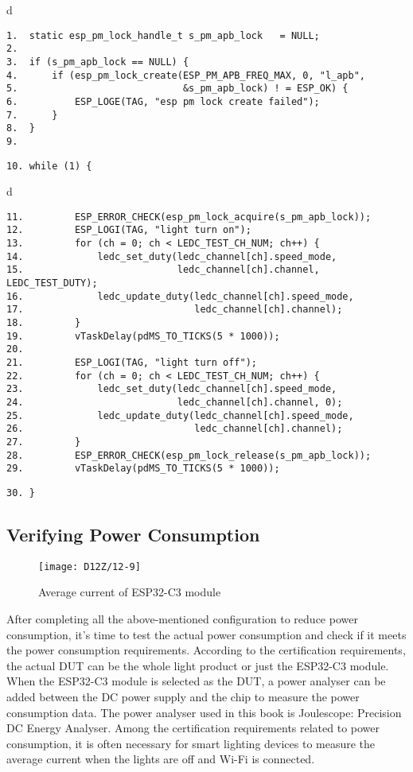 \documentclass[a4paper,12pt]{book}
\begin{document}
\begin{codebloc}
\begin{tabular}{d}
\vspace{2pt}
\begin{verbatim}
1.	static esp_pm_lock_handle_t s_pm_apb_lock   = NULL;
2.	
3.	if (s_pm_apb_lock == NULL) {
4. 	    if (esp_pm_lock_create(ESP_PM_APB_FREQ_MAX, 0, "l_apb",
5.                             &s_pm_apb_lock) ! = ESP_OK) {
6. 	        ESP_LOGE(TAG, "esp pm lock create failed");
7. 	    }
8.	}
9.	
\end{verbatim}
\verb|10. while (1) {|
\end{tabular}
\end{codebloc}

\begin{codebloc}
\begin{tabular}{d}
\vspace{2pt}
\begin{verbatim}
11.         ESP_ERROR_CHECK(esp_pm_lock_acquire(s_pm_apb_lock));
12.         ESP_LOGI(TAG, "light turn on");
13.         for (ch = 0; ch < LEDC_TEST_CH_NUM; ch++) {
14.             ledc_set_duty(ledc_channel[ch].speed_mode,
15.                           ledc_channel[ch].channel, LEDC_TEST_DUTY);
16.             ledc_update_duty(ledc_channel[ch].speed_mode,
17.                              ledc_channel[ch].channel);
18.         }
19.         vTaskDelay(pdMS_TO_TICKS(5 * 1000));
20.
21.         ESP_LOGI(TAG, "light turn off");
22.         for (ch = 0; ch < LEDC_TEST_CH_NUM; ch++) {
23.             ledc_set_duty(ledc_channel[ch].speed_mode,
24.                           ledc_channel[ch].channel, 0);
25.             ledc_update_duty(ledc_channel[ch].speed_mode,
26.                              ledc_channel[ch].channel);
27.         }
28.         ESP_ERROR_CHECK(esp_pm_lock_release(s_pm_apb_lock));
29.         vTaskDelay(pdMS_TO_TICKS(5 * 1000));
\end{verbatim}
\verb|30. }|
\end{tabular}
\end{codebloc}

\subsection{Verifying Power Consumption}
\begin{figure}[!h]
    \centering
    \texttt{[image: D12Z/12-9]}
    \caption{Average current of ESP32-C3 module}
\end{figure}
After completing all the above-mentioned configuration to reduce power consumption, it’s time to test the actual power consumption and check if it meets the power consumption requirements. According to the certification requirements, the actual DUT can be the whole light product or just the ESP32-C3 module. When the ESP32-C3 module is selected as the DUT, a power analyser can be added between the DC power supply and the chip to measure the power consumption data. The power analyser used in this book is Joulescope: Precision DC Energy Analyser. Among the certification requirements related to power consumption, it is often necessary for smart lighting devices to measure the average current when the lights are off and Wi-Fi is connected.
\end{document}
